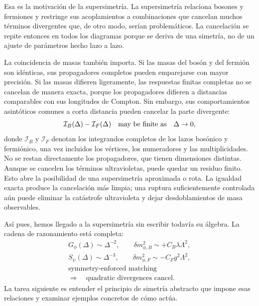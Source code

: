 Esa es la motivación de la supersimetría. La supersimetría relaciona bosones y fermiones y restringe sus acoplamientos a combinaciones que cancelan muchos términos divergentes que, de otro modo, serían problemáticos. La cancelación se repite entonces en todos los diagramas porque se deriva de una simetría, no de un ajuste de parámetros hecho lazo a lazo.

La coincidencia de masas también importa. Si las masas del bosón y del fermión son idénticas, sus propagadores completos pueden emparejarse con mayor precisión. Si las masas difieren ligeramente, las respuestas finitas completas no se cancelan de manera exacta, porque los propagadores difieren a distancias comparables con sus longitudes de Compton. Sin embargo, sus comportamientos asintóticos comunes a corta distancia pueden cancelar la parte divergente:
\begin{equation}
\mathcal I_B(\Delta)-\mathcal I_F(\Delta)
\quad\hbox{may be finite as}\quad \Delta\to0,
\end{equation}
donde \(\mathcal I_B\) y \(\mathcal I_F\) denotan los integrandos completos de los lazos bosónico y fermiónico, una vez incluidos los vértices, los numeradores y las multiplicidades. No se restan directamente los propagadores, que tienen dimensiones distintas. Aunque se cancelen los términos ultravioletas, puede quedar un residuo finito. Esto abre la posibilidad de una supersimetría aproximada o rota. La igualdad exacta produce la cancelación más limpia; una ruptura suficientemente controlada aún puede eliminar la catástrofe ultravioleta y dejar desdoblamientos de masa observables.

Así pues, hemos llegado a la supersimetría sin escribir todavía su álgebra. La cadena de razonamiento está completa:
\begin{equation}
\begin{gathered}
G_\phi(\Delta)\sim \Delta^{-2},
\qquad
\delta m_{\phi,B}^2\sim+C_B\lambda\Lambda^2,\\[0.4em]
S_\psi(\Delta)\sim \Delta^{-3},
\qquad
\delta m_{\phi,F}^2\sim-C_Fg^2\Lambda^2,\\[0.4em]
\text{symmetry-enforced matching}\\
\Longrightarrow\quad
\text{quadratic divergences cancel}.
\end{gathered}
\end{equation}
La tarea siguiente es entender el principio de simetría abstracto que impone esas relaciones y examinar ejemplos concretos de cómo actúa.